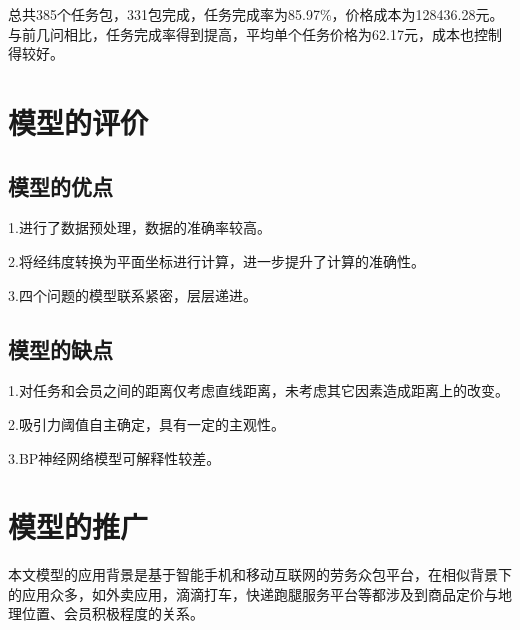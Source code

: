\documentclass[withoutpreface,bwprint]{cumcmthesis} %
\newcommand{\upcite}[1]{\textsuperscript{\textsuperscript{\cite{#1}}}}
\begin{document}
总共385个任务包，331包完成，任务完成率为85.97\%，价格成本为128436.28元。与前几问相比，任务完成率得到提高，平均单个任务价格为62.17元，成本也控制得较好。


\section{模型的评价}
\subsection{模型的优点}

1.进行了数据预处理，数据的准确率较高。

2.将经纬度转换为平面坐标进行计算，进一步提升了计算的准确性。

3.四个问题的模型联系紧密，层层递进。

\subsection{模型的缺点}

1.对任务和会员之间的距离仅考虑直线距离，未考虑其它因素造成距离上的改变。

2.吸引力阈值自主确定，具有一定的主观性。

3.BP神经网络模型可解释性较差。


\section{模型的推广}

本文模型的应用背景是基于智能手机和移动互联网的劳务众包平台\upcite{2018YOLOv3}，在相似背景下的应用众多，如外卖应用，滴滴打车，快递跑腿服务平台等都涉及到商品定价与地理位置、会员积极程度的关系\upcite{2017YOLO9000}。




\end{document}
